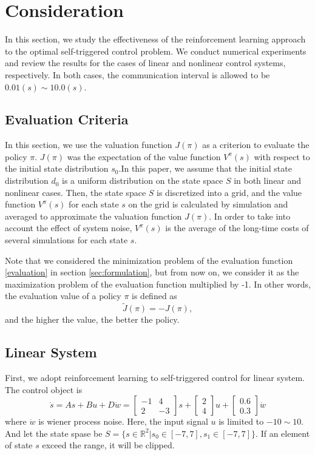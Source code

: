 \documentclass[english, dvipdfmx]{ampmt}             %
\begin{document}
\section{Consideration}
In this section, we study the effectiveness of the reinforcement learning approach to the optimal self-triggered control problem. We conduct numerical experiments and review the results for the cases of linear and nonlinear control systems, respectively. In both cases, the communication interval is allowed to be $0.01 (s) \sim 10.0 (s)$. 

\subsection{Evaluation Criteria}
In this section, we use the valuation function $J(\pi)$ as a criterion to evaluate the policy $\pi$. $J(\pi)$ was the expectation of the value function $V^{\pi}(s)$ with respect to the initial state distribution $s_0$.In this paper, we assume that the initial state distribution $d_0$ is a uniform distribution on the state space $S$ in both linear and nonlinear cases. Then, the state space $S$ is discretized into a grid, and the value function $V^{\pi}(s)$ for each state $s$ on the grid is calculated by simulation and averaged to approximate the valuation function $J(\pi)$. In order to take into account the effect of system noise, $V^{\pi}(s)$ is the average of the long-time costs of several simulations for each state $s$.\par
Note that we considered the minimization problem of the evaluation function \eqref{evaluation} in section \ref{sec:formulation}, but from now on, we consider it as the maximization problem of the evaluation function multiplied by -1. In other words, the evaluation value of a policy $\pi$ is defined as 
\begin{equation}
	\tilde{J}(\pi) = - J(\pi),
\end{equation}
and the higher the value, the better the policy.

\subsection{Linear System}
First, we adopt reinforcement learning to self-triggered control for linear system. The control object is
\begin{equation}
	\dot{s} = As + Bu + D\dot{w}= \begin{bmatrix}-1& 4 \\ 2 & -3\end{bmatrix}s + \begin{bmatrix}2 \\ 4\end{bmatrix}u + \begin{bmatrix}0.6 \\ 0.3\end{bmatrix}\dot{w}
\end{equation}
where $\dot{w}$ is wiener process noise. Here, the input signal $u$ is limited to $-10 \sim 10$. And let the state spase be $S = \{s\in \mathbb{R}^2| s_0\in[-7,7], s_1\in[-7,7]\}$. If an element of state $s$
 exceed the range, it will be clipped.
\end{document}
